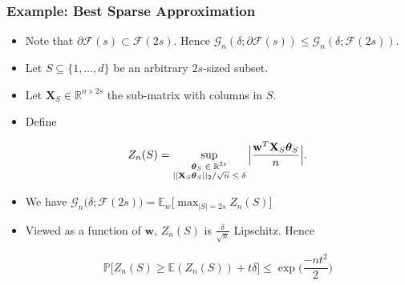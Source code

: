 \documentclass[11pt]{beamer}
\newcommand{\Prob}{\mathbb{P}}
\newcommand{\E}{\mathbb{E}}
\newcommand{\cF}{\mathcal{F}}
\newcommand{\cG}{\mathcal{G}}
\begin{document}
	\begin{frame}
		\frametitle{Example: Best Sparse Approximation}
		\begin{itemize}
			\item Note that $\partial \cF(s) \subset \cF(2s)$. 	Hence $\cG_n(\delta; \partial \cF(s)) \leq \cG_n(\delta; \cF(2s))$.
			\item Let $S\subseteq \{1, \dots, d\}$ be an arbitrary $2s$-sized subset.
			\item Let $\mathbf{X}_S \in \mathbb{R}^{n\times 2s}$ the sub-matrix with columns in $S$.
			\item Define 
			\begin{small}
			\begin{equation*}
						Z_n(S) = \sup_{\begin{scriptsize}
					\begin{matrix}
					\boldsymbol{\theta}_S  \in \mathbb{R}^{2s}\\
					||\mathbf{X}_S\boldsymbol{\theta}_S||_2/\sqrt{n} \leq \delta
					\end{matrix}
					\end{scriptsize}}\Big|\frac{\mathbf{w}^T\mathbf{X}_S\boldsymbol{\theta}_S}{n}\Big|.
			\end{equation*}
			\end{small}
			\item We have $\cG_n\big(\delta; \cF(2s)\big) = \E_w\Big[\max_{|S|=2s} Z_n(S)\Big]$
			\item Viewed as a function of $\mathbf{w}$, $Z_n(S)$ is $\frac{\delta}{\sqrt{n}}$ Lipschitz. Hence
			\begin{small}
				\begin{equation*}
					\Prob\big[Z_n(S) \geq \E(Z_n(S)) + t\delta\big] \leq \exp\Big(\frac{-nt^2}{2}\Big)
				\end{equation*}
			\end{small}						
		\end{itemize}
	\end{frame}
	
\end{document}
